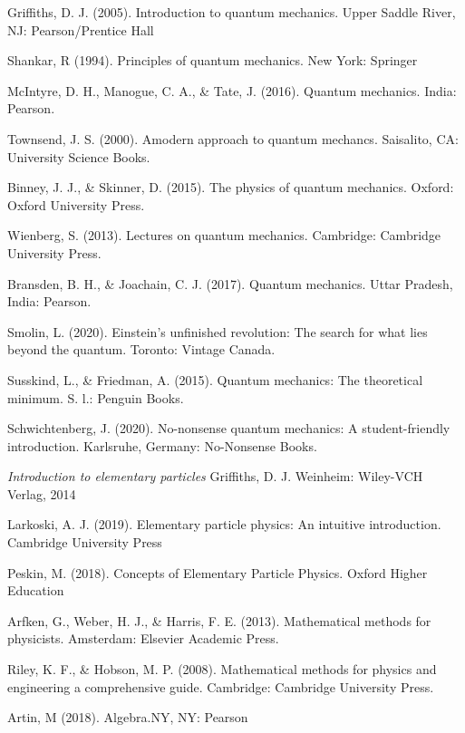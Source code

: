 \documentclass[a4paper,12pt]{book}
\begin{document}
\begin{thebibliography}{9}
	
	 Griffiths, D. J. (2005). Introduction to quantum mechanics. Upper Saddle River, NJ: Pearson/Prentice Hall 
	
	 Shankar, R (1994). Principles of quantum mechanics. New York: Springer
	
	 McIntyre, D. H., Manogue, C. A., \& Tate, J. (2016). Quantum mechanics. India: Pearson.
	
	 Townsend, J. S. (2000). Amodern approach to quantum mechancs. Saisalito, CA: University Science Books.
	
	  Binney, J. J., \& Skinner, D. (2015). The physics of quantum mechanics. Oxford: Oxford University Press.
	
	 Wienberg, S. (2013). Lectures on quantum mechanics. Cambridge: Cambridge University Press.
	
	  Bransden, B. H., \& Joachain, C. J. (2017). Quantum mechanics. Uttar Pradesh, India: Pearson.
	
	 Smolin, L. (2020). Einstein's unfinished revolution: The search for what lies beyond the quantum. Toronto: Vintage Canada.
	
	 Susskind, L., \& Friedman, A. (2015). Quantum mechanics: The theoretical minimum. S. l.: Penguin Books.
	
	 Schwichtenberg, J. (2020). No-nonsense quantum mechanics: A student-friendly introduction. Karlsruhe, Germany: No-Nonsense Books.
	
	 \emph{Introduction to elementary particles}
	\newblock Griffiths, D. J.
	\newblock Weinheim: Wiley-VCH Verlag, 2014
	
	 Larkoski, A. J. (2019). Elementary particle physics: An intuitive introduction. Cambridge University Press 
	
	 Peskin, M. (2018). Concepts of Elementary Particle Physics. Oxford Higher Education 
	
	  Arfken, G., Weber, H. J., \& Harris, F. E. (2013). Mathematical methods for physicists. Amsterdam: Elsevier Academic Press.
	
	 Riley, K. F., \& Hobson, M. P. (2008). Mathematical methods for physics and engineering a comprehensive guide. Cambridge: Cambridge University Press.
	
	 Artin, M (2018). Algebra.NY, NY: Pearson
	

\end{thebibliography}
\end{document}
